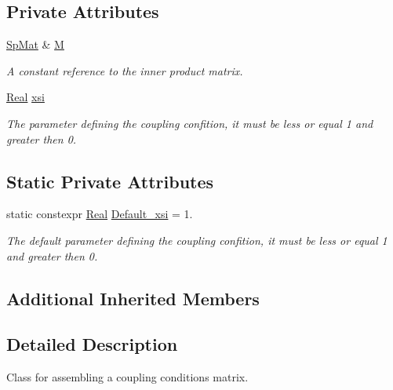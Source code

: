 \subsection*{Private Attributes}
\begin{DoxyCompactItemize}
\item 
\hyperlink{namespaceFVCode3D_ac1032289d96638cf0ad6c52ef639095f}{Sp\+Mat} \& \hyperlink{classFVCode3D_1_1CouplingConditions_a6aff06f6efb2dbd28fe17bc6c1c03ce9}{M}
\begin{DoxyCompactList}\small\item\em A constant reference to the inner product matrix. \end{DoxyCompactList}\item 
\hyperlink{namespaceFVCode3D_a40c1f5588a248569d80aa5f867080e83}{Real} \hyperlink{classFVCode3D_1_1CouplingConditions_a03825be63a95a269b19a80d079d58f12}{xsi}
\begin{DoxyCompactList}\small\item\em The parameter defining the coupling confition, it must be less or equal 1 and greater then 0. \end{DoxyCompactList}\end{DoxyCompactItemize}
\subsection*{Static Private Attributes}
\begin{DoxyCompactItemize}
\item 
static constexpr \hyperlink{namespaceFVCode3D_a40c1f5588a248569d80aa5f867080e83}{Real} \hyperlink{classFVCode3D_1_1CouplingConditions_a65e0fbd0172c5322cfedd1d01d12e8a6}{Default\+\_\+xsi} = 1.
\begin{DoxyCompactList}\small\item\em The default parameter defining the coupling confition, it must be less or equal 1 and greater then 0. \end{DoxyCompactList}\end{DoxyCompactItemize}
\subsection*{Additional Inherited Members}


\subsection{Detailed Description}
Class for assembling a coupling conditions matrix. 

